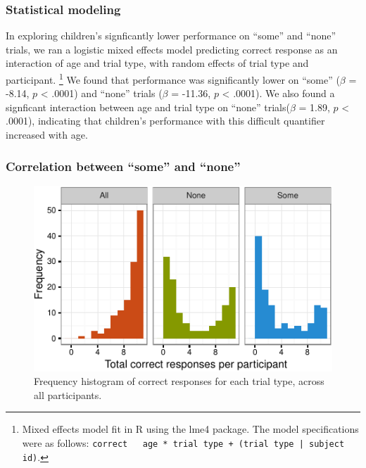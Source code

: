 \documentclass[10pt, letterpaper]{article}
\newenvironment{CodeChunk}{}{}
\begin{document}
\subsubsection{Statistical modeling}\label{statistical-modeling}

In exploring children's signficantly lower performance on ``some'' and
``none'' trials, we ran a logistic mixed effects model predicting
correct response as an interaction of age and trial type, with random
effects of trial type and participant.
\footnote{Mixed effects model fit in R using the lme4 package. The model specifications were as follows: \texttt{correct ~ age * trial type + (trial type | subject id)}.}
We found that performance was significantly lower on ``some'' (\(\beta\)
= -8.14, \(p\) \textless{} .0001) and ``none'' trials (\(\beta\) =
-11.36, \(p\) \textless{} .0001). We also found a signficant interaction
between age and trial type on ``none'' trials(\(\beta\) = 1.89, \(p\)
\textless{} .0001), indicating that children's performance with this
difficult quantifier increased with age.

\subsubsection{Correlation between ``some'' and
``none''}\label{correlation-between-some-and-none}

\begin{CodeChunk}
\begin{figure}[h]
\includegraphics{figs/diptest-1} \caption[Frequency histogram of correct responses for each trial type, across all participants]{Frequency histogram of correct responses for each trial type, across all participants.}\label{fig:diptest}
\end{figure}
\end{CodeChunk}
\end{document}
